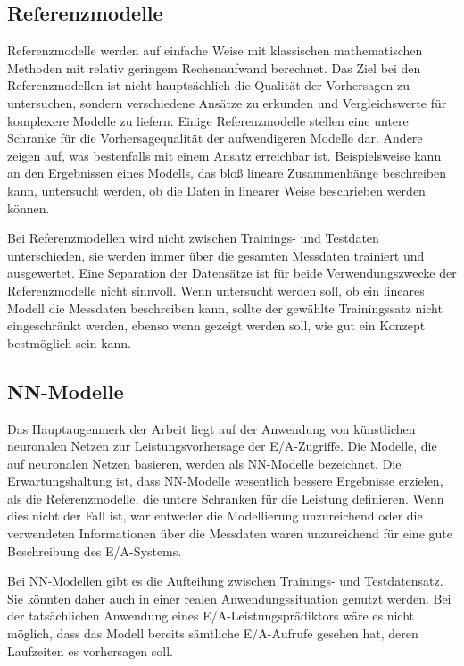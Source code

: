 \documentclass[
	twoside,
	12pt,
	a4paper,
	BCOR10mm,
	DIV14,
	listof=totoc,
	bibliography=totoc,
	headsepline
]{scrreprt}
\begin{document}
\subsection{Referenzmodelle}
Referenzmodelle werden auf einfache Weise mit klassischen mathematischen Methoden mit relativ geringem Rechenaufwand berechnet.
Das Ziel bei den Referenzmodellen ist nicht hauptsächlich die Qualität der Vorhersagen zu untersuchen, sondern verschiedene Ansätze zu erkunden und Vergleichswerte für komplexere Modelle zu liefern.
Einige Referenzmodelle stellen eine untere Schranke für die Vorhersagequalität der aufwendigeren Modelle dar. Andere zeigen auf, was bestenfalls mit einem Ansatz erreichbar ist.
Beispielsweise kann an den Ergebnissen eines Modells, das bloß lineare Zusammenhänge beschreiben kann, untersucht werden, ob die Daten in linearer Weise beschrieben werden können.\medskip

Bei Referenzmodellen wird nicht zwischen Trainings- und Testdaten unterschieden, sie werden immer über die gesamten Messdaten trainiert und ausgewertet.
Eine Separation der Datensätze ist für beide Verwendungszwecke der Referenzmodelle nicht sinnvoll. 
Wenn untersucht werden soll, ob ein lineares Modell die Messdaten beschreiben kann, sollte der gewählte Trainingssatz nicht eingeschränkt werden, ebenso wenn gezeigt werden soll, wie gut ein Konzept bestmöglich sein kann.

\subsection{NN-Modelle}
Das Hauptaugenmerk der Arbeit liegt auf der Anwendung von künstlichen neuronalen Netzen zur Leistungsvorhersage der E/A-Zugriffe. Die Modelle, die auf neuronalen Netzen basieren, werden als NN-Modelle bezeichnet.
Die Erwartungshaltung ist, dass NN-Modelle wesentlich bessere Ergebnisse erzielen, als die Referenzmodelle, die untere Schranken für die Leistung definieren.
Wenn dies nicht der Fall ist, war entweder die Modellierung unzureichend oder die verwendeten Informationen über die Messdaten waren unzureichend für eine gute Beschreibung des E/A-Systems.\medskip

Bei NN-Modellen gibt es die Aufteilung zwischen Trainings- und Testdatensatz.
Sie könnten daher auch in einer realen Anwendungssituation genutzt werden. 
Bei der tatsächlichen Anwendung eines E/A-Leistungsprädiktors wäre es nicht möglich, dass das Modell bereits sämtliche E/A-Aufrufe gesehen hat, deren Laufzeiten es vorhersagen soll.
\end{document}
